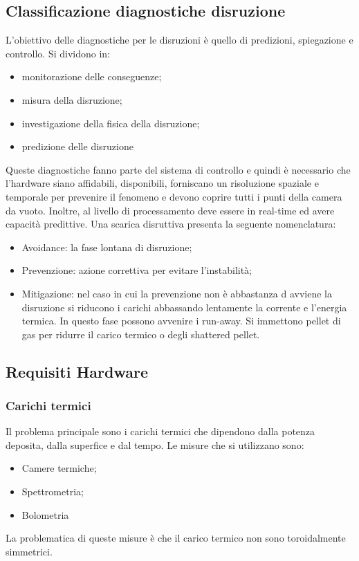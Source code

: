 \documentclass{article}
\begin{document}
\subsection{Classificazione diagnostiche disruzione}
L'obiettivo delle diagnostiche per le disruzioni è quello di predizioni, spiegazione e controllo. Si dividono in:
\begin{itemize}
	\item monitorazione delle conseguenze;
	\item misura della disruzione;
	\item investigazione della fisica della disruzione;
	\item predizione delle disruzione
\end{itemize}
Queste diagnostiche fanno parte del sistema di controllo e quindi è necessario che l'hardware siano affidabili, disponibili, forniscano un risoluzione spaziale e temporale per prevenire il fenomeno e devono coprire tutti i punti della camera da vuoto. Inoltre, al livello di processamento deve essere in real-time ed avere capacità predittive.
Una scarica disruttiva presenta la seguente nomenclatura:
\begin{itemize}
	\item Avoidance: la fase lontana di disruzione;
	\item Prevenzione: azione correttiva per evitare l'instabilità;
	\item Mitigazione: nel caso in cui la prevenzione non è abbastanza d avviene la disruzione si riducono i carichi abbassando lentamente la corrente e l'energia termica. In questo fase possono avvenire i run-away. Si immettono pellet di gas per ridurre il carico termico o degli shattered pellet.
\end{itemize}
\subsection{Requisiti Hardware}
\subsubsection{Carichi termici}
Il problema principale sono i carichi termici che dipendono dalla potenza deposita, dalla superfice e dal tempo. Le misure che si utilizzano sono:\begin{itemize}
	\item Camere termiche;
	\item Spettrometria;
	\item Bolometria
\end{itemize}
La problematica di queste misure è che il carico termico non sono toroidalmente simmetrici.
\end{document}
